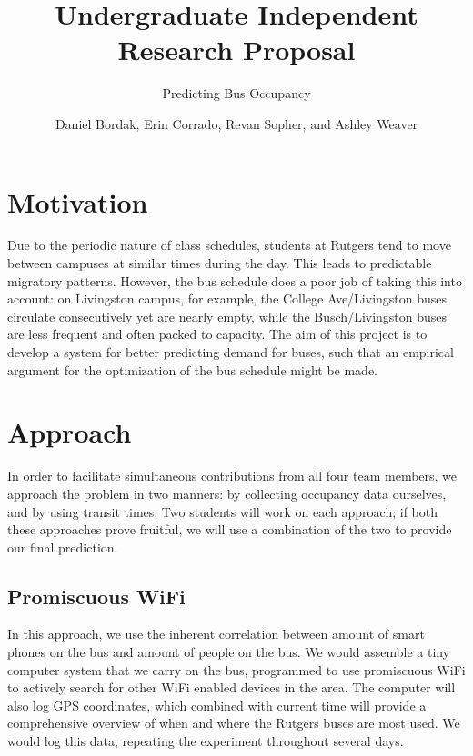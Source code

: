 \documentclass[letterpaper,english]{scrreprt}
\begin{document}
\title{Undergraduate Independent Research Proposal}
\subtitle{Predicting Bus Occupancy}
\author{Daniel Bordak, Erin Corrado, Revan Sopher, and Ashley Weaver}

\maketitle

\section*{Motivation}

Due to the periodic nature of class schedules, students at Rutgers tend to move between campuses at similar times during the day.
This leads to predictable migratory patterns. However, the bus schedule does a poor job of taking this into account: on Livingston campus, for example, the College Ave/Livingston buses circulate consecutively yet are nearly empty, while the Busch/Livingston buses are less frequent and often packed to capacity.
The aim of this project is to develop a system for better predicting demand for buses, such that an empirical argument for the optimization of the bus schedule might be made.

\section*{Approach}

In order to facilitate simultaneous contributions from all four team members, we approach the problem in two manners: by collecting occupancy data ourselves, and by using transit times.
Two students will work on each approach; if both these approaches prove fruitful, we will use a combination of the two to provide our final prediction.

\subsection*{Promiscuous WiFi}

In this approach, we use the inherent correlation between amount of smart phones on the bus and amount of people on the bus.
We would assemble a tiny computer system that we carry on the bus, programmed to use promiscuous WiFi to actively search for other WiFi enabled devices in the area.
The computer will also log GPS coordinates, which combined with current time will provide a comprehensive overview of when and where the Rutgers buses are most used. We would log this data, repeating the experiment throughout several days.
\end{document}
